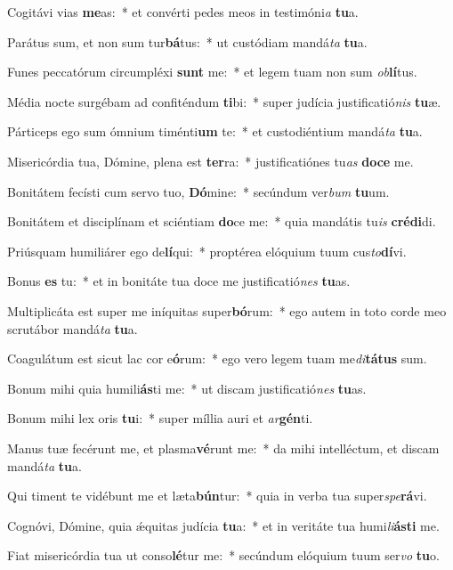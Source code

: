 \item Cogitávi vias \textbf{me}as:~* et convérti pedes meos in testimóni\textit{a} \textbf{tu}a.
\item Parátus sum, et non sum tur\textbf{bá}tus:~* ut custódiam mandá\textit{ta} \textbf{tu}a.
\item Funes peccatórum circumpléxi \textbf{sunt} me:~* et legem tuam non sum \textit{ob}\textbf{lí}tus.
\item Média nocte surgébam ad confiténdum \textbf{ti}bi:~* super judícia justificatió\textit{nis} \textbf{tu}æ.
\item Párticeps ego sum ómnium timénti\textbf{um} te:~* et custodiéntium mandá\textit{ta} \textbf{tu}a.
\item Misericórdia tua, Dómine, plena est \textbf{ter}ra:~* justificatiónes tu\textit{as} \textbf{do}\textbf{ce} me.
\item Bonitátem fecísti cum servo tuo, \textbf{Dó}mine:~* secúndum ver\textit{bum} \textbf{tu}um.
\item Bonitátem et disciplínam et sciéntiam \textbf{do}ce me:~* quia mandátis tu\textit{is} \textbf{cré}\textbf{di}di.
\item Priúsquam humiliárer ego de\textbf{lí}qui:~* proptérea elóquium tuum cus\textit{to}\textbf{dí}vi.
\item Bonus \textbf{es} tu:~* et in bonitáte tua doce me justificatió\textit{nes} \textbf{tu}as.
\item Multiplicáta est super me iníquitas super\textbf{bó}rum:~* ego autem in toto corde meo scrutábor mandá\textit{ta} \textbf{tu}a.
\item Coagulátum est sicut lac cor e\textbf{ó}rum:~* ego vero legem tuam me\textit{di}\textbf{tá}\textbf{tus} sum.
\item Bonum mihi quia humili\textbf{ás}ti me:~* ut discam justificatió\textit{nes} \textbf{tu}as.
\item Bonum mihi lex oris \textbf{tu}i:~* super míllia auri et \textit{ar}\textbf{gén}ti.
\item Manus tuæ fecérunt me, et plasma\textbf{vé}runt me:~* da mihi intelléctum, et discam mandá\textit{ta} \textbf{tu}a.
\item Qui timent te vidébunt me et læta\textbf{bún}tur:~* quia in verba tua super\textit{spe}\textbf{rá}vi.
\item Cognóvi, Dómine, quia ǽquitas judícia \textbf{tu}a:~* et in veritáte tua humi\textit{li}\textbf{ás}\textbf{ti} me.
\item Fiat misericórdia tua ut conso\textbf{lé}tur me:~* secúndum elóquium tuum ser\textit{vo} \textbf{tu}o.
